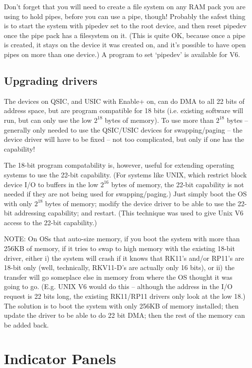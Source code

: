 Don't forget that you will need to create a file system on any RAM pack you
are using to hold pipes, before you can use a pipe, though! Probably the
safest thing is to start the system with pipedev set to the root device, and
then reset pipedev once the pipe pack has a filesystem on it. (This is quite
OK, because once a pipe is created, it stays on the device it was created on,
and it's possible to have open pipes on more than one device.) A program to
set `pipedev' is available for V6.

\section{Upgrading drivers}

The devices on QSIC, and USIC with Enable+ on, can do DMA to all 22 bits of
address space, but are program compatible for 18 bits (i.e. existing software
will run, but can only use the low $2^{18}$ bytes of memory). To use more
than $2^{18}$ bytes -- generally only needed to use the QSIC/USIC devices for
swapping/paging -- the device driver will have to be fixed -- not too
complicated, but only if one has the capability!

The 18-bit program compatability is, however, useful for extending operating
systems to use the 22-bit capability. (For systems like UNIX, which restrict
block device I/O to buffers in the low $2^{16}$ bytes of memory, the
22-bit capability is not needed if they are not being used for swapping/paging.)
Just simply boot the OS with only $2^{18}$ bytes of memory; modify the device
driver to be able to use the 22-bit addressing capability; and restart. (This
technique was used to give Unix V6 access to the 22-bit capability.)

NOTE: On OSs that auto-size memory, if you boot the system with more than
256KB of memory, if it tries to swap to high memory with the existing 18-bit
driver, either i) the system will crash if it knows that RK11's and/or RP11's
are 18-bit only (well, technically, RKV11-D's are actually only 16 bits), or
ii) the transfer will go someplace else in memory from where the OS thought
it was going to go. (E.g. UNIX V6 would do this -- although the address in the
I/O request is 22 bits long, the existing RK11/RP11 drivers only look at the
low 18.) The solution is to boot the system with only 256KB of memory
installed; then update the driver to be able to do 22 bit DMA; then the rest
of the memory can be added back.


\chapter{Indicator Panels}

